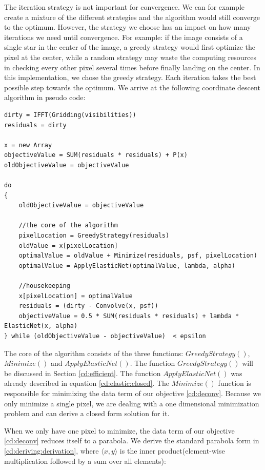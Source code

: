 The iteration strategy is not important for convergence. We can for example create a mixture of the different strategies and the algorithm would still converge to the optimum. However, the strategy we choose has an impact on how many iterations we need until convergence. For example: if the image consists of a single star in the center of the image, a greedy strategy would first optimize the pixel at the center, while a random strategy may waste the computing resources in checking every other pixel several times before finally landing on the center. In this implementation, we chose the greedy strategy. Each iteration takes the best possible step towards the optimum. We arrive at the following coordinate descent algorithm in pseudo code:


\begin{lstlisting}
dirty = IFFT(Gridding(visibilities))
residuals = dirty

x = new Array
objectiveValue = SUM(residuals * residuals) + P(x)
oldObjectiveValue = objectiveValue

do 
{
	oldObjectiveValue = objectiveValue

	//the core of the algorithm
	pixelLocation = GreedyStrategy(residuals)
	oldValue = x[pixelLocation]
	optimalValue = oldValue + Minimize(residuals, psf, pixelLocation)
	optimalValue = ApplyElasticNet(optimalValue, lambda, alpha)
	
	//housekeeping
	x[pixelLocation] = optimalValue
	residuals = (dirty - Convolve(x, psf))
	objectiveValue = 0.5 * SUM(residuals * residuals) + lambda * ElasticNet(x, alpha)
} while (oldObjectiveValue - objectiveValue)  < epsilon
\end{lstlisting}

The core of the algorithm consists of the three functions: $GreedyStrategy()$, $Minimize()$ and $ApplyElasticNet()$. The function $GreedyStrategy()$ will be discussed in Section \ref{cd:efficient}. The function $ApplyElasticNet()$ was already described in equation \eqref{cd:elastic:closed}. The $Minimize()$ function is responsible for minimizing the data term of our objective \eqref{cd:deconv}. Because we only minimize a single pixel, we are dealing with a one dimensional minimization problem and can derive a closed form solution for it.

When we only have one pixel to minimize, the data term of our objective \eqref{cd:deconv} reduces itself to a parabola. We derive the standard parabola form in \eqref{cd:deriving:derivation}, where $\langle x, y\rangle$ is the inner product(element-wise multiplication followed by a sum over all elements):

